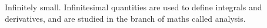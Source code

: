 Infinitely small. Infinitesimal quantities are used
to define integrals and derivatives, and are studied
in the branch of maths called analysis.
